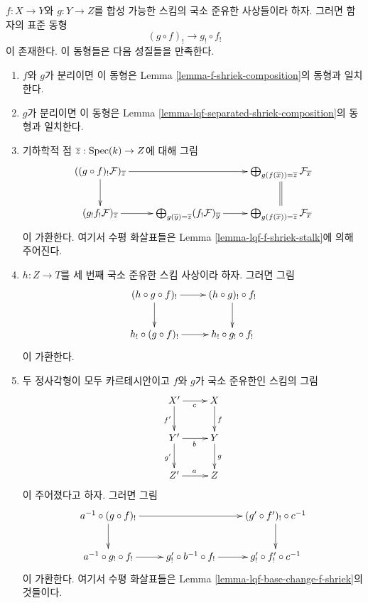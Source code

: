 \begin{lemma}
\label{lemma-lqf-shriek-composition}
$f : X \to Y$와 $g : Y \to Z$를 합성 가능한 스킴의 국소 준유한
사상들이라 하자. 그러면 함자의 표준 동형
$$
(g \circ f)_! \longrightarrow g_! \circ f_!
$$
이 존재한다. 이 동형들은 다음 성질들을 만족한다.
\begin{enumerate}
\item $f$와 $g$가 분리이면 이 동형은 Lemma
\ref{lemma-f-shriek-composition}의 동형과 일치한다.
\item $g$가 분리이면 이 동형은 Lemma
\ref{lemma-lqf-separated-shriek-composition}의 동형과 일치한다.
\item 기하학적 점 $\overline{z} : \mathop{\mathrm{Spec}}(k) \to Z$에 대해 그림
$$
\xymatrix{
((g \circ f)_!\mathcal{F})_{\overline{z}} \ar[d] \ar[rr] & &
\bigoplus\nolimits_{g(f(\overline{x})) = \overline{z}}
\mathcal{F}_{\overline{x}} \ar@{=}[d] \\
(g_!f_!\mathcal{F})_{\overline{z}} \ar[r] &
\bigoplus\nolimits_{g(\overline{y}) = \overline{z}}
(f_!\mathcal{F})_{\overline{y}} \ar[r] &
\bigoplus\nolimits_{g(f(\overline{x})) = \overline{z}}
\mathcal{F}_{\overline{x}}
}
$$
이 가환한다. 여기서 수평 화살표들은 Lemma
\ref{lemma-lqf-f-shriek-stalk}에 의해 주어진다.
\item $h : Z \to T$를 세 번째 국소 준유한 스킴 사상이라 하자.
그러면 그림
$$
\xymatrix{
(h \circ g \circ f)_! \ar[r] \ar[d] &
(h \circ g)_! \circ f_! \ar[d] \\
h_! \circ (g \circ f)_! \ar[r] &
h_! \circ g_! \circ f_!
}
$$
이 가환한다.
\item 두 정사각형이 모두 카르테시안이고 $f$와 $g$가 국소 준유한인
스킴의 그림
$$
\xymatrix{
X' \ar[d]_{f'} \ar[r]_c & X \ar[d]^f \\
Y' \ar[d]_{g'} \ar[r]_b & Y \ar[d]^g \\
Z' \ar[r]^a & Z
}
$$
이 주어졌다고 하자. 그러면 그림
$$
\xymatrix{
a^{-1} \circ (g \circ f)_! \ar[d] \ar[rr] & &
(g' \circ f')_! \circ c^{-1} \ar[d] \\
a^{-1} \circ g_! \circ f_! \ar[r] &
g'_! \circ b^{-1} \circ f_! \ar[r] &
g'_! \circ f'_! \circ c^{-1}
}
$$
이 가환한다. 여기서 수평 화살표들은 Lemma
\ref{lemma-lqf-base-change-f-shriek}의 것들이다.
\end{enumerate}
\end{lemma}

